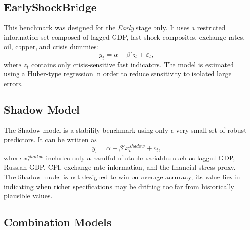 \documentclass[12pt,a4paper]{article}
\begin{document}
\subsection{EarlyShockBridge}

This benchmark was designed for the \textit{Early} stage only. It uses a restricted information set composed of lagged GDP, fast shock composites, exchange rates, oil, copper, and crisis dummies:
\begin{equation}
    y_t = \alpha + \beta' z_t + \varepsilon_t,
\end{equation}
where $z_t$ contains only crisis-sensitive fast indicators. The model is estimated using a Huber-type regression in order to reduce sensitivity to isolated large errors.

\subsection{Shadow Model}

The Shadow model is a stability benchmark using only a very small set of robust predictors. It can be written as
\begin{equation}
    y_t = \alpha + \beta' x_t^{shadow} + \varepsilon_t,
\end{equation}
where $x_t^{shadow}$ includes only a handful of stable variables such as lagged GDP, Russian GDP, CPI, exchange-rate information, and the financial stress proxy. The Shadow model is not designed to win on average accuracy; its value lies in indicating when richer specifications may be drifting too far from historically plausible values.

\subsection{Combination Models}
\end{document}
